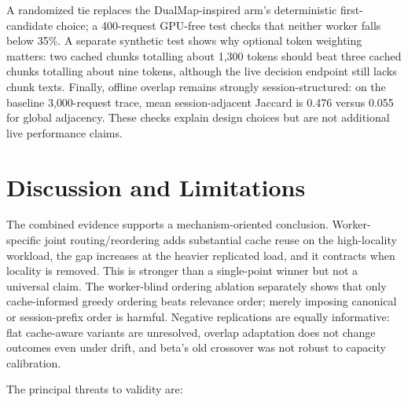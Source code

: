 \documentclass[conference]{IEEEtran}
\begin{document}
A randomized tie replaces the DualMap-inspired arm's deterministic
first-candidate choice; a 400-request GPU-free test checks that neither
worker falls below 35\%. A separate synthetic test shows why optional
token weighting matters: two cached chunks totalling about 1{,}300
tokens should beat three cached chunks totalling about nine tokens,
although the live decision endpoint still lacks chunk texts. Finally,
offline overlap remains strongly session-structured: on the baseline
3{,}000-request trace, mean session-adjacent Jaccard is 0.476 versus
0.055 for global adjacency. These checks explain design choices but are
not additional live performance claims.

\section{Discussion and Limitations}

The combined evidence supports a mechanism-oriented conclusion.
Worker-specific joint routing/reordering adds substantial cache reuse on
the high-locality workload, the gap increases at the heavier replicated
load, and it contracts when locality is removed. This is stronger than a
single-point winner but not a universal claim. The worker-blind ordering
ablation separately shows that only cache-informed greedy ordering beats
relevance order; merely imposing canonical or session-prefix order is
harmful. Negative replications are equally informative: flat
cache-aware variants are unresolved, overlap adaptation does not change
outcomes even under drift, and beta's old crossover was not robust to
capacity calibration.

The principal threats to validity are:
\end{document}

